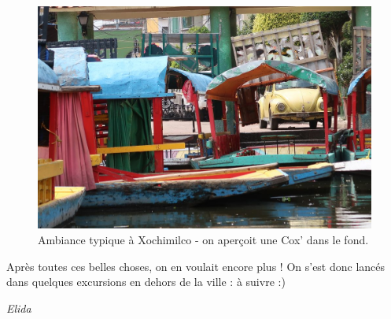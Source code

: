 \begin{figure}
\centering
\includegraphics{images/20180930_xochimilco.JPG}
\caption{Ambiance typique à Xochimilco - on aperçoit une Cox' dans le
fond.}
\end{figure}

Après toutes ces belles choses, on en voulait encore plus ! On s'est
donc lancés dans quelques excursions en dehors de la ville : à suivre :)

\emph{Elida}
